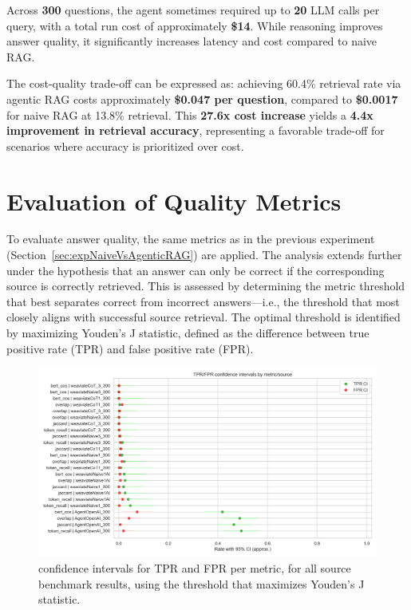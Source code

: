 Across \textbf{300} questions, the agent sometimes required up to \textbf{20} \gls{LLM} calls per query, with a total run cost of approximately \textbf{\$14}. While reasoning improves answer quality, it significantly increases latency and cost compared to naive \gls{RAG}.

The cost-quality trade-off can be expressed as: achieving 60.4\% retrieval rate via agentic \gls{RAG} costs approximately \textbf{\$0.047 per question}, compared to \textbf{\$0.0017} for naive \gls{RAG} at 13.8\% retrieval. This \textbf{27.6x cost increase} yields a \textbf{4.4x improvement in retrieval accuracy}, representing a favorable trade-off for scenarios where accuracy is prioritized over cost.

\section{Evaluation of Quality Metrics}
\label{sec:metric-evaluation-quality}
To evaluate answer quality, the same metrics as in the previous experiment (Section~\ref{sec:expNaiveVsAgenticRAG}) are applied. The analysis extends further under the hypothesis that an answer can only be correct if the corresponding source is correctly retrieved. This is assessed by determining the metric threshold that best separates correct from incorrect answers—i.e., the threshold that most closely aligns with successful source retrieval. The optimal threshold is identified by maximizing Youden's J statistic, defined as the difference between true positive rate (TPR) and false positive rate (FPR).
\begin{figure}[H]
    \centering
    \includegraphics[width=1\linewidth]{Figures/06_tpr_fpr_confidence_intervals.png}
    \caption{confidence intervals for TPR and FPR per metric, for all source benchmark results, using the threshold that maximizes Youden's J statistic.}\label{fig:confidence-intervals}
\end{figure}

